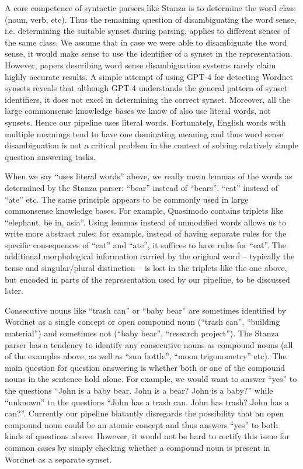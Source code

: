 \documentclass[runningheads]{llncs}
\begin{document}
A core competence of syntactic parsers like Stanza is to determine the word class (noun, verb, etc).
Thus the remaining question of disambiguating the word sense, i.e. determining the suitable synset during parsing, 
applies to different senses of the same class.
We assume that in case we were able to disambiguate the word sense, it would make sense
to use the identifier of a synset in the representation. However, papers describing
word sense disambiguation systems rarely claim highly accurate results. A simple attempt of
using GPT-4 for detecting Wordnet synsets reveals that although GPT-4 understands the
general pattern of synset identifiers, it does not excel in determining the correct
synset. Moreover, all the large commonsense knowledge bases we know of also use literal
words, not synsets. Hence our pipeline uses literal words. Fortunately, English words with
multiple meanings tend to have one dominating meaning and thus word sense disambiguation
is not a critical problem in the context of solving relatively simple question answering tasks.

When we say ``uses literal words'' above, we really mean lemmas of the words as determined by
the Stanza parser: ``bear'' instead of ``bears'', ``eat'' instead of ``ate'' etc.  
The same principle appears to be commonly used in large commonsense knowledge
bases. For example, Quasimodo contains triplets like ``elephant, 	be in, 	asia''.
Using lemmas instead of unmodified words allows us to write more abstract rules: for example, instead
of having separate rules for the specific consequences of ``eat'' and ``ate'', it suffices to
have rules for ``eat''.
The additional morphological information carried by the original word -- typically the tense and singular/plural
distinction -- is lost in the triplets like the one above, but encoded in parts of the representation used by our pipeline, 
to be discussed later. 

Consecutive nouns like ``trash can'' or ``baby bear'' are sometimes identified
by Wordnet as a single concept or open compound noun (``trash can'', ``building material'') 
and sometimes not (``baby bear'', ``research project''). 
The Stanza parser has a tendency to identify any consecutive nouns as compound nouns
(all of the examples above, as well as ``sun bottle'', ``moon trigonometry'' etc). The main question
for question answering is whether both or one of the compound nouns in the sentence
hold alone. For example, we would want to answer ``yes'' to the questions ``John is a baby bear. John is a bear? John is a baby?''
while ``unknown'' to the questions ``John has a trash can. John has trash? John has a can?''.
Currently our pipeline blatantly disregards the possibility that an open compound noun
could be an atomic concept and thus answers ``yes'' to both kinds of questions above. However,
it would not be hard to rectify this issue for common cases by simply checking whether a
compound noun is present in Wordnet as a separate synset. 
\end{document}
